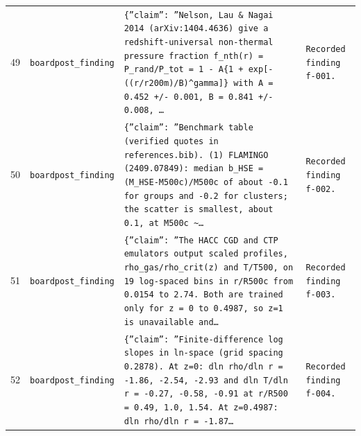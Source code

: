 \documentclass[11pt,a4paper]{article}
\begin{document}
\begin{longtable}{@{}p{}p{}p{}p{}@{}}
49 & \texttt{board}\newline\texttt{post\_\allowbreak{}finding} & \texttt{\{''claim'':\allowbreak{} ''Nelson,\allowbreak{} Lau \& Nagai 2014 (arXiv:\allowbreak{}1404.4636)\allowbreak{} give a redshift-universal non-thermal pressure fraction f\_\allowbreak{}nth(r)\allowbreak{} =\allowbreak{} P\_\allowbreak{}rand/\allowbreak{}P\_\allowbreak{}tot =\allowbreak{} 1 - A\{1 + exp[-((r/\allowbreak{}r200m)\allowbreak{}/\allowbreak{}B)\allowbreak{}\textasciicircum{}\allowbreak{}gamma]\allowbreak{}\}\allowbreak{} with A =\allowbreak{} 0.452 +/\allowbreak{}- 0.001,\allowbreak{} B =\allowbreak{} 0.841 +/\allowbreak{}- 0.008,\allowbreak{} \ldots{}\allowbreak{}} & \texttt{Recorded finding f-001.} \\
50 & \texttt{board}\newline\texttt{post\_\allowbreak{}finding} & \texttt{\{''claim'':\allowbreak{} ''Benchmark table (verified quotes in references.bib)\allowbreak{}. (1)\allowbreak{} FLAMINGO (2409.07849)\allowbreak{}:\allowbreak{} median b\_\allowbreak{}HSE =\allowbreak{} (M\_\allowbreak{}HSE-M500c)\allowbreak{}/\allowbreak{}M500c of about -0.1 for groups and -0.2 for clusters;\allowbreak{} the scatter is smallest,\allowbreak{} about 0.1,\allowbreak{} at M500c \textasciitilde{}\allowbreak{}\ldots{}\allowbreak{}} & \texttt{Recorded finding f-002.} \\
51 & \texttt{board}\newline\texttt{post\_\allowbreak{}finding} & \texttt{\{''claim'':\allowbreak{} ''The HACC CGD and CTP emulators output scaled profiles,\allowbreak{} rho\_\allowbreak{}gas/\allowbreak{}rho\_\allowbreak{}crit(z)\allowbreak{} and T/\allowbreak{}T500,\allowbreak{} on 19 log-spaced bins in r/\allowbreak{}R500c from 0.0154 to 2.74. Both are trained only for z =\allowbreak{} 0 to 0.4987,\allowbreak{} so z=\allowbreak{}1 is unavailable and\ldots{}\allowbreak{}} & \texttt{Recorded finding f-003.} \\
52 & \texttt{board}\newline\texttt{post\_\allowbreak{}finding} & \texttt{\{''claim'':\allowbreak{} ''Finite-difference log slopes in ln-space (grid spacing 0.2878)\allowbreak{}. At z=\allowbreak{}0:\allowbreak{} dln rho/\allowbreak{}dln r =\allowbreak{} -1.86,\allowbreak{} -2.54,\allowbreak{} -2.93 and dln T/\allowbreak{}dln r =\allowbreak{} -0.27,\allowbreak{} -0.58,\allowbreak{} -0.91 at r/\allowbreak{}R500 =\allowbreak{} 0.49,\allowbreak{} 1.0,\allowbreak{} 1.54. At z=\allowbreak{}0.4987:\allowbreak{} dln rho/\allowbreak{}dln r =\allowbreak{} -1.87\ldots{}\allowbreak{}} & \texttt{Recorded finding f-004.} \\

\end{longtable}
\end{document}
